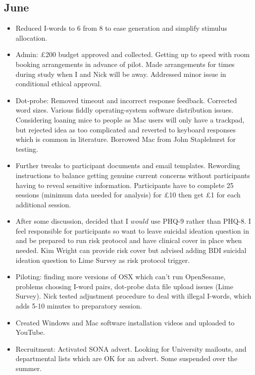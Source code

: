 \documentclass[british]{article}
\begin{document}
\subsection{June}
\begin{itemize}
  \item Reduced I-words to 6 from 8 to ease generation and simplify
  stimulus allocation.

  \item Admin: \pounds200 budget approved and collected. Getting up to
  speed with room booking arrangements in advance of pilot. Made arrangements
  for times during study when I and Nick will be away. Addressed minor issue in
  conditional ethical approval.

  \item Dot-probe: Removed timeout and incorrect response
  feedback. Corrected word sizes. Various fiddly operating-system software
  distribution issues. Considering loaning mice to people as Mac users
  will only have a trackpad, but rejected idea as too complicated and
  reverted to keyboard responses which is common in literature. Borrowed
  Mac from John Staplehurst for testing.

  \item Further tweaks to participant documents and email
  templates. Rewording instructions to balance getting genuine current
  concerns without participants having to reveal sensitive information.
  Participants have to complete 25 sessions (minimum data needed for
  analysis) for \pounds10 then get \pounds1 for each additional session.

  \item After some discussion, decided that I ${would}$ use PHQ-9 rather
  than PHQ-8. I feel responsible for participants so want to leave
  suicidal ideation question in and be prepared to run risk protocol
  and have clinical cover in place when needed. Kim Wright can provide
  risk cover but advised adding BDI suicidal ideation question to Lime
  Survey as risk protocol trigger.

  \item Piloting: finding more versions of OSX which can't run OpenSesame,
  problems choosing I-word pairs, dot-probe data file upload issues
  (Lime Survey). Nick tested adjustment procedure to deal with illegal I-words,
  which adds 5-10 minutes to preparatory session.

  \item Created Windows and Mac software installation videos and uploaded to
  YouTube.

  \item Recruitment: Activated SONA advert. Looking for University mailouts, and
    departmental lists which are OK for an advert. Some suspended over the summer.

\end{itemize}
\end{document}

